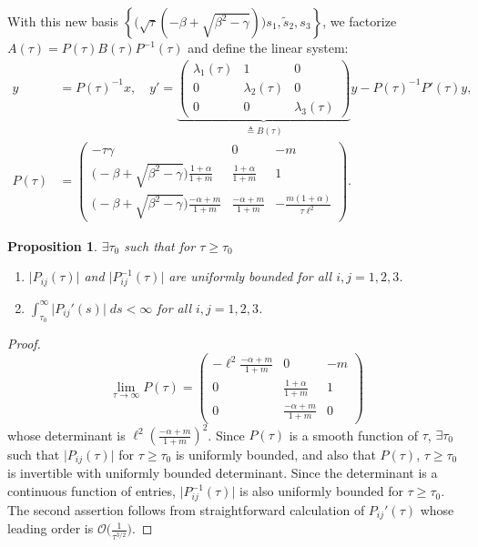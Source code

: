 \documentclass[a4paper,11pt]{article}
\def\l{{\ell}}
\newtheorem{proposition}{Proposition}[section]
\theoremstyle{remark}
\begin{document}
With this new basis $\left\{\Big(\sqrt{\tau}(-\beta+\sqrt{\beta^2-\gamma})\Big)s_1,\tilde s_2, s_3 \right\}$, we factorize \\$A(\tau) = P(\tau)B(\tau)P^{-1}(\tau)$ and define the linear system:
\begin{equation}\label{eq:factor}
\begin{aligned}
 y &= P(\tau)^{-1} x, \quad  y' = \underbrace{\begin{pmatrix} \lambda_1(\tau) & 1 & 0\\0 & \lambda_2(\tau) & 0\\0 & 0 & \lambda_3(\tau)\end{pmatrix}}_{\triangleq B(\tau)} y - P(\tau)^{-1}P'(\tau) y,\\
 P(\tau) &= \begin{pmatrix} -\tau\gamma& 0 & -m\\ \Big(-\beta+\sqrt{\beta^2-\gamma}\Big)\frac{1+\alpha}{1+m} & \frac{1+\alpha}{1+m} & 1\\ \Big(-\beta+\sqrt{\beta^2-\gamma}\Big)\frac{-\alpha+m}{1+m} & \frac{-\alpha+m}{1+m} & -\frac{m(1+\alpha)}{\tau\l^2}\end{pmatrix}.
\end{aligned}
\end{equation}
\begin{proposition} \label{prop:factor}$\exists \tau_0$ such that for $\tau\ge\tau_0$
 \begin{enumerate}
  \item  $\big|P_{ij}(\tau)\big|$ and $\big|P^{-1}_{ij}(\tau)\big|$ are uniformly bounded for all $i,j=1,2,3$.
  \item $\displaystyle \int_{\tau_0}^\infty \big|P_{ij}'(s)\big|\; ds < \infty$ for all $i,j=1,2,3$.
 \end{enumerate}
\end{proposition}
\begin{proof}
$$ \lim_{\tau \rightarrow \infty} P(\tau) = \begin{pmatrix} -\l^2\frac{-\alpha+m}{1+m}& 0 & -m\\ 0 & \frac{1+\alpha}{1+m} & 1\\ 0 & \frac{-\alpha+m}{1+m} & 0\end{pmatrix}$$
whose determinant is $\l^2 \left(\frac{-\alpha+m}{1+m}\right)^2$. Since $P(\tau)$ is a smooth function of $\tau$, $\exists \tau_0$ such that $\big|P_{ij}(\tau)\big|$ for $\tau\ge\tau_0$ is uniformly bounded, and also that $P(\tau)$, $\tau\ge\tau_0$ is invertible with uniformly bounded determinant. Since the determinant is a continuous function of entries, $\big|P^{-1}_{ij}(\tau)\big|$ is also uniformly bounded for $\tau\ge \tau_0$. The second assertion follows from straightforward calculation of $P_{ij}'(\tau)$ whose leading order is $\mathcal{O}\big(\frac{1}{\tau^{3/2}}\big)$.
\end{proof}
\end{document}
